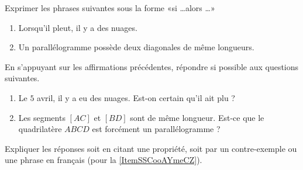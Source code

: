
\begin{exercice}\label{exosmath-0897}

    Exprimer les phrases suivantes sous la forme «si \ldots alors \ldots» 
    \begin{enumerate}
        \item
            Lorsqu'il pleut, il y a des nuages.
        \item
            Un parallélogramme possède deux diagonales de même longueurs.
    \end{enumerate}
    En s'appuyant sur les affirmations précédentes, répondre si possible aux questions suivantes.
    \begin{enumerate}
        \item   \label{ItemSSCooAYmeCZ}
            Le \( 5\) avril, il y a eu des nuages. Est-on certain qu'il ait plu ?
        \item
            Les segments \( [AC]\) et \( [BD]\) sont de même longueur. Est-ce que le quadrilatère \( ABCD\) est forcément un parallélogramme ?
    \end{enumerate}

    Expliquer les réponses soit en citant une propriété, soit par un contre-exemple ou une phrase en français (pour la \ref{ItemSSCooAYmeCZ}).

\end{exercice}
